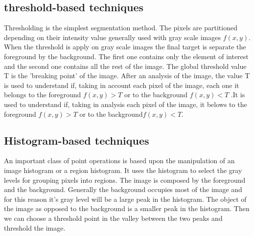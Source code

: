 \subsection{threshold-based techniques}
Thresholding is the simplest segmentation method. The pixels are partitioned depending on their intensity value generally used with gray scale images $f(x,y)$. When the threshold is apply on gray scale images the final target is separate the foreground by the background. The first one contains only the element of interest and the second one contains all the rest of the image. The global threshold value T is the 'breaking point' of the image. After an analysis of the image, the value T is used to understand if, taking in account each pixel of the image, each one it belongs to the foreground $f(x, y) > T$ or to the background $f(x, y) < T$ .It is used to understand if, taking in analysis each pixel of the image, it belows to the foreground $f(x, y) > T$ or to the background$f(x, y) < T$.\cite{Threshold}

\subsection{Histogram-based techniques}
An important class of point operations is based upon the manipulation of an image histogram or a region histogram. It uses the histogram to select the gray levels for grouping pixels into regions. The image is composed by the foreground and the background. Generally the background occupies most of the image and for this reason it's gray level will be a large peak in the histogram. The object of the image as opposed to the background is a smaller peak in the histogram. Then we can choose a threshold point in the valley between the two peaks and threshold the image.

